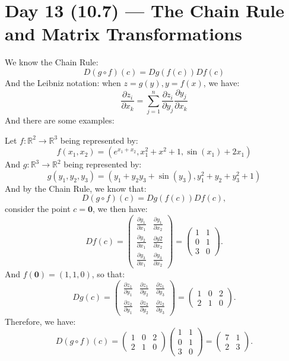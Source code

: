 \documentclass[11pt]{article}
\newenvironment{example}[1]{\begin{exbox}{#1}{}}{\end{exbox}}
\theoremstyle{quiet}
\theoremstyle{quietremark}
\begin{document}
\section{Day 13 (10.7) --- The Chain Rule and Matrix Transformations}
We know the Chain Rule:
\[
D(g\circ f)(c)=Dg(f(c))Df(c)
\]
And the Leibniz notation: when $z=g(y),y=f(x)$, we have:
\[
\frac{\partial z_i}{\partial x_k}=\sum_{j=1}^n\frac{\partial z_i}{\partial y_j}\frac{\partial y_j}{\partial x_k}
\]
And there are some examples:
\begin{example}{}
Let $f:\mathbb{R}^2\to\mathbb{R}^3$ being represented by: 
\[
f(x_1,x_2)=(e^{x_1+x_2},x_1^2+x^2+1,\sin(x_1)+2x_1)
\]
And $g:\mathbb{R}^3\to\mathbb{R}^2$ being represented by:
\[
g(y_1,y_2,y_3)=(y_1+y_2y_3+\sin(y_3),y_1^2+y_2+y_3^2+1)
\]
And by the Chain Rule, we know that:
\[
D(g\circ f)(c)=Dg(f(c))Df(c),
\]
consider the point $c=\mathbf{0}$, we then have:
\[
Df(c)=\begin{pmatrix}\frac{\partial y_1}{\partial x_1}&\frac{\partial y_1}{\partial x_2}\\\frac{\partial y_2}{\partial x_1}&\frac{\partial y2}{\partial x_2}\\\frac{\partial y_3}{\partial x_1}&\frac{\partial y_3}{\partial x_2}\end{pmatrix}=\begin{pmatrix}1&1\\0&1\\3&0\end{pmatrix}.
\]
And $f(\mathbf{0})=(1,1,0)$, so that:
\[
Dg(c)=\begin{pmatrix}\frac{\partial z_1}{\partial y_1}&\frac{\partial z_1}{\partial y_2}&\frac{\partial z_1}{\partial y_3}\\\frac{\partial z_2}{\partial y_1}&\frac{\partial z_2}{\partial y_2}&\frac{\partial z_2}{\partial y_3}\end{pmatrix}=\begin{pmatrix}1&0&2\\2&1&0\end{pmatrix}.
\]
Therefore, we have:
\[
D(g\circ f)(c)=\begin{pmatrix}1&0&2\\2&1&0\end{pmatrix}\begin{pmatrix}1&1\\0&1\\3&0\end{pmatrix}=\begin{pmatrix}7&1\\2&3\end{pmatrix}.
\]
\end{example}
\end{document}
